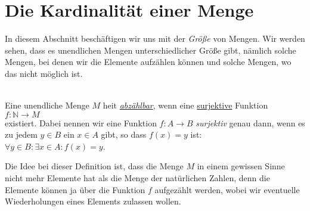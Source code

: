 \section{Die Kardinalit\"at einer Menge}
In diesem Abschnitt besch\"aftigen wir uns mit der \emph{Gr\"o{\ss}e} von Mengen.  Wir werden sehen,
dass es unendlichen Mengen unterschiedlicher Gr\"o{\ss}e gibt, n\"amlich solche Mengen, bei denen wir
die Elemente aufz\"ahlen k\"onnen und solche Mengen, wo das nicht m\"oglich ist.

\begin{Definition} \hspace*{\fill} \\
Eine unendliche Menge $M$ hei\3t 
\href{https://en.wikipedia.org/wiki/Countable_set}{\emph{abz\"{a}hlbar}}, wenn eine 
\href{https://en.wikipedia.org/wiki/Surjective_function}{surjektive} Funktion
\\[0.2cm]
\hspace*{1.3cm}
$f: \mathbb{N} \rightarrow M$
\\[0.2cm]
existiert.  Dabei nennen wir eine Funktion $f:A \rightarrow B$  \emph{surjektiv} genau
dann, wenn es zu jedem $y \in B$ ein $x \in A$ gibt, so dass $f(x) = y$ ist:
\\[0.2cm]
\hspace*{1.3cm}
$\forall y \in B: \exists x \in A: f(x) = y$.  \eox
\end{Definition}

Die Idee bei dieser Definition ist, dass die Menge  $M$ in einem gewissen Sinne nicht mehr Elemente hat
als die Menge der nat\"{u}rlichen Zahlen, denn die Elemente k\"{o}nnen ja \"{u}ber die Funktion $f$
aufgez\"{a}hlt werden, wobei wir eventuelle Wiederholungen eines Elements zulassen wollen.

